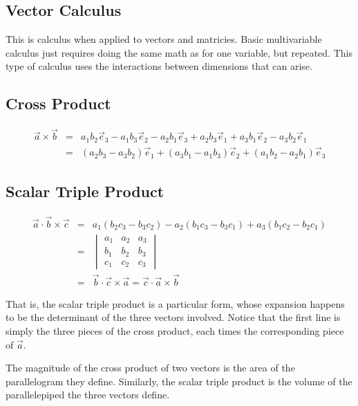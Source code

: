 \begin{center}\section{Vector Calculus}\end{center}

This is calculus when applied to vectors and matricies. Basic
multivariable calculus just requires doing the same math as for one
variable, but repeated. This type of calculus uses the interactions
between dimensions that can arise.

\bigskip

\subsection{Cross Product}
\vspace{-1em}
\begin{eqnarray*}
{\vec a} \times {\vec b}
&=& a_1b_2{\vec e_3} - a_1b_3{\vec e_2} - a_2b_1{\vec e_3}
+a_2b_3{\vec e_1} +a_3b_1{\vec e_2} -a_3b_2{\vec e_1} \\
&=& (a_2b_3 - a_3b_2){\vec e_1} + (a_3b_1 - a_1b_3){\vec e_2} +
(a_1b_2 - a_2b_1){\vec e_3}
\end{eqnarray*}

\subsection{Scalar Triple Product}

\begin{eqnarray*}
{\vec a} \cdot {\vec b} \times {\vec c}
&=& a_1(b_2c_3 - b_3c_2) - a_2(b_1c_3 - b_3c_1) + a_3(b_1c_2 - b_2c_1)
\\
&=& \begin{vmatrix}
a_1 & a_2 & a_3 \\
b_1 & b_2 & b_3 \\
c_1 & c_2 & c_3
\end{vmatrix} \\
&=& {\vec b} \cdot {\vec c} \times {\vec a}
= {\vec c} \cdot {\vec a} \times {\vec b}
\end{eqnarray*}

That is, the scalar triple product is a particular form, whose
expansion happens to be the determinant of the three vectors
involved. Notice that the first line is simply the three pieces of the
cross product, each times the corresponding piece of ${\vec a}$.

The magnitude of the cross product of two vectors is the
area of the parallelogram they define. Similarly, the scalar triple
product is the volume of the parallelepiped the three vectors define.

